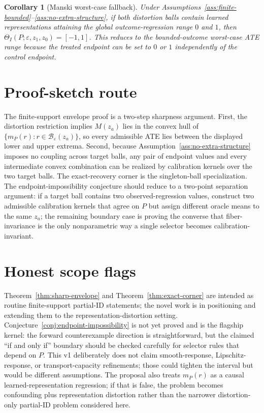 \documentclass[11pt]{article}
\theoremstyle{definition}
\theoremstyle{plain}
\newtheorem{corollary}{Corollary}
\theoremstyle{remark}
\begin{document}
\begin{corollary}[Manski worst-case fallback]\label{cor:manski}
Under Assumptions~\ref{ass:finite-bounded}--\ref{ass:no-extra-structure}, if both distortion balls contain learned representations attaining the global outcome-regression range \(0\) and \(1\), then
\(\Theta_I(P;\varepsilon,z_1,z_0)=[-1,1]\). This reduces to the bounded-outcome worst-case ATE range because the treated endpoint can be set to \(0\) or \(1\) independently of the control endpoint.
\end{corollary}

\section{Proof-sketch route}
The finite-support envelope proof is a two-step sharpness argument. First, the distortion restriction implies \(M(z_a)\) lies in the convex hull of \(\{m_P(r):r\in\mathcal B_\varepsilon(z_a)\}\), so every admissible ATE lies between the displayed lower and upper extrema. Second, because Assumption~\ref{ass:no-extra-structure} imposes no coupling across target balls, any pair of endpoint values and every intermediate convex combination can be realized by calibration kernels over the two target balls. The exact-recovery corner is the singleton-ball specialization. The endpoint-impossibility conjecture should reduce to a two-point separation argument: if a target ball contains two observed-regression values, construct two admissible calibration kernels that agree on \(P\) but assign different oracle means to the same \(z_a\); the remaining boundary case is proving the converse that fiber-invariance is the only nonparametric way a single selector becomes calibration-invariant.

\section{Honest scope flags}
Theorem~\ref{thm:sharp-envelope} and Theorem~\ref{thm:exact-corner} are intended as routine finite-support partial-ID statements; the novel work is in positioning and extending them to the representation-distortion setting. Conjecture~\ref{conj:endpoint-impossibility} is not yet proved and is the flagship kernel: the forward counterexample direction is straightforward, but the claimed ``if and only if'' boundary should be checked carefully for selector rules that depend on \(P\). This v1 deliberately does not claim smooth-response, Lipschitz-response, or transport-capacity refinements; those could tighten the interval but would be different assumptions. The proposal also treats \(m_P(r)\) as a causal learned-representation regression; if that is false, the problem becomes confounding plus representation distortion rather than the narrower distortion-only partial-ID problem considered here.
\end{document}
